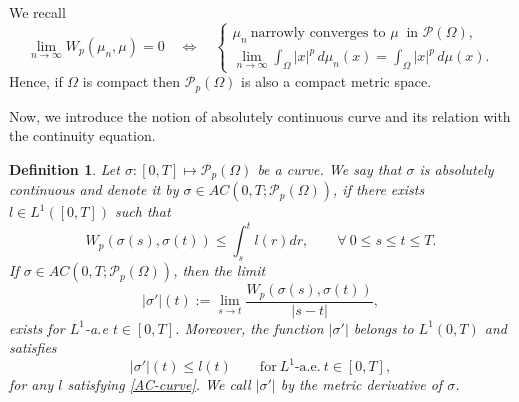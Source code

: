 \documentclass{amsart}
\newtheorem{defn}{Definition}[section]
\numberwithin{equation}{section}
\begin{document}
We recall 
 \begin{equation*}
\lim_{n \rightarrow \infty} W_p(\mu_n, \mu)=0 \quad \Longleftrightarrow \quad
\begin{cases}
\mu_n ~\mbox{narrowly converges to } \mu ~\mbox{ in }  \mathcal{P}(\Omega),\\
\lim_{n\rightarrow \infty} \int_{\Omega} |x|^p\, d\mu_n(x) = \int_{\Omega} |x|^p\,d \mu(x).
\end{cases}
\end{equation*}
Hence, if $\Omega$ is compact then $\mathcal{P}_p(\Omega)$ is also a compact metric space.%



Now, we introduce the notion of absolutely continuous curve and its relation with the continuity equation.
\begin{defn}
Let $\sigma:[0,T]\mapsto \mathcal{P}_p (\Omega)$ be a curve.
We say that $\sigma$ is absolutely continuous and denote it by $\sigma \in AC(0, T;\mathcal{P}_p (\Omega))$, if there exists $l\in
L^1([0,T])$ such that
\begin{equation}\label{AC-curve}
W_p(\sigma(s),\sigma(t))\leq \int_s^t l(r)dr,\qquad \forall ~ 0\leq s\leq t\leq T.
\end{equation}
If $\sigma \in AC(0,T;\mathcal{P}_p (\Omega))$, then the limit
$$|\sigma'|(t):=\lim_{s\rightarrow t}\frac{W_p(\sigma(s),\sigma(t))}{|s-t|} ,$$
exists for $L^1$-a.e $t\in[0,T]$. Moreover, the function $|\sigma'|$ belongs to $L^1(0,T)$ and satisfies
\begin{equation*}
|\sigma'|(t)\leq l(t) \qquad \mbox{for} ~L^1\mbox{-a.e.}~t\in [0,T],
\end{equation*}
for any $l$ satisfying \eqref{AC-curve}.
We call $|\sigma'|$ by the metric derivative of $\sigma$.
\end{defn}
\end{document}
